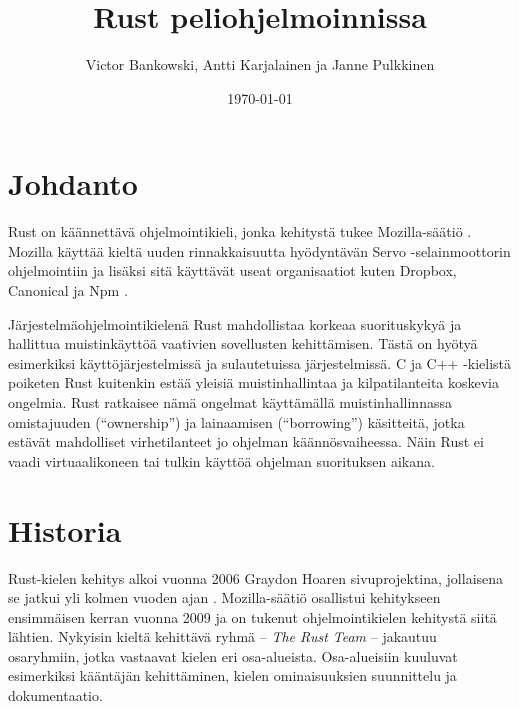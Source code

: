 \documentclass[finnish]{tktltiki2}
\title{Rust peliohjelmoinnissa}
\author{Victor Bankowski, Antti Karjalainen ja Janne Pulkkinen}
\date{\today}
\theoremstyle{definition}
\theoremstyle{remark}
\begin{document}

\frontmatter      %

\maketitle        %
\makeabstract     %

\tableofcontents  %


\mainmatter       %

\section{Johdanto}

Rust on käännettävä ohjelmointikieli, jonka kehitystä tukee Mozilla-säätiö \cite{servo}. Mozilla käyttää kieltä uuden rinnakkaisuutta hyödyntävän Servo -selainmoottorin ohjelmointiin ja lisäksi sitä käyttävät useat organisaatiot kuten Dropbox, Canonical ja Npm \cite{RustFriends}.

Järjestelmäohjelmointikielenä Rust mahdollistaa korkeaa suorituskykyä ja hallittua muistinkäyttöä vaativien sovellusten kehittämisen. Tästä on hyötyä esimerkiksi käyttöjärjestelmissä ja sulautetuissa järjestelmissä. C ja C++ -kielistä poiketen Rust kuitenkin estää yleisiä muistinhallintaa ja kilpatilanteita koskevia ongelmia. Rust ratkaisee nämä ongelmat käyttämällä muistinhallinnassa omistajuuden (“ownership”) ja lainaamisen (“borrowing”) käsitteitä, jotka estävät mahdolliset virhetilanteet jo ohjelman käännösvaiheessa. Näin Rust ei vaadi virtuaalikoneen tai tulkin käyttöä ohjelman suorituksen aikana.

\section{Historia}

Rust-kielen kehitys alkoi vuonna 2006 Graydon Hoaren sivuprojektina, jollaisena se jatkui yli kolmen vuoden ajan \cite{RustFaq}. Mozilla-säätiö osallistui kehitykseen ensimmäisen kerran vuonna 2009 ja on tukenut ohjelmointikielen kehitystä siitä lähtien. Nykyisin kieltä kehittävä ryhmä -- \textit{The Rust Team} -- jakautuu osaryhmiin, jotka vastaavat kielen eri osa-alueista. Osa-alueisiin kuuluvat esimerkiksi kääntäjän kehittäminen, kielen ominaisuuksien suunnittelu ja dokumentaatio.
\end{document}
